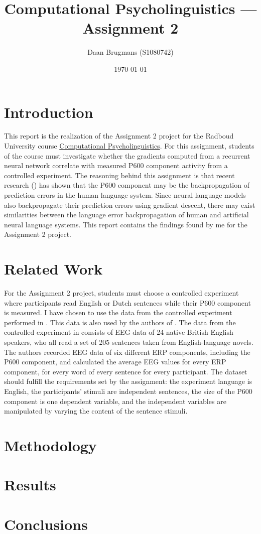\documentclass{IEEEtran}
\begin{document}
\title{Computational Psycholinguistics --- Assignment 2}
\author{Daan Brugmans (S1080742)}
\date{\today}

\maketitle

\section{Introduction}
This report is the realization of the Assignment 2 project for the Radboud University course \href{https://www.ru.nl/courseguides/arts/courses/ma/rema-lc/let-rema-lcex28/}{Computational Psycholinguistics}.
For this assignment, students of the course must investigate whether the gradients computed from a recurrent neural network correlate with measured P600 component activity from a controlled experiment.
The reasoning behind this assignment is that recent research (\cite{fitz2019erp,frank2024gradients}) has shown that the P600 component may be the backpropagation of prediction errors in the human language system.
Since neural language models also backpropagate their prediction errors using gradient descent, there may exist similarities between the language error backpropagation of human and artificial neural language systems.
This report contains the findings found by me for the Assignment 2 project.

\section{Related Work}
For the Assignment 2 project, students must choose a controlled experiment where participants read English or Dutch sentences while their P600 component is measured.
I have chosen to use the data from the controlled experiment performed in \cite{frank2015erp}.
This data is also used by the authors of \cite{frank2024gradients}.
The data from the controlled experiment in \cite{frank2015erp} consists of EEG data of 24 native British English speakers, who all read a set of 205 sentences taken from English-language novels.
The authors recorded EEG data of six different ERP components, including the P600 component, and calculated the average EEG values for every ERP component, for every word of every sentence for every participant.
The dataset should fulfill the requirements set by the assignment: the experiment language is English, the participants' stimuli are independent sentences, the size of the P600 component is one dependent variable, and the independent variables are manipulated by varying the content of the sentence stimuli.

\section{Methodology}


\section{Results}


\section{Conclusions}




\onecolumn
\appendix
\end{document}
